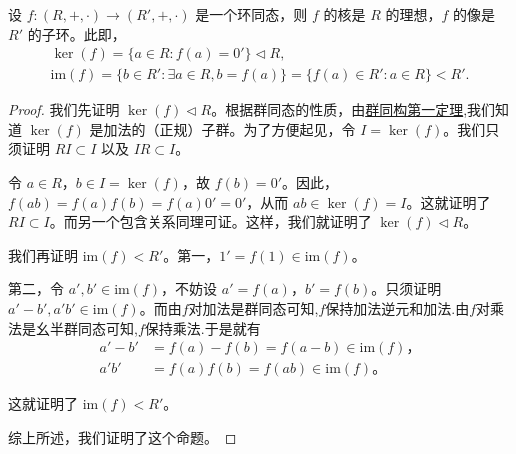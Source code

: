 \documentclass[../../main.tex]{subfiles}
\begin{document}
\begin{proposition}[环同态的核是理想并且像是子环]\label{proposition:环同态的核是理想并且像是子环}
设 $f : (R, +, \cdot) \to (R', +, \cdot)$ 是一个环同态，则 $f$ 的核是 $R$ 的理想，$f$ 的像是 $R'$ 的子环。此即，
\begin{gather*}
\ker(f) = \{a \in R : f(a) = 0'\} \lhd R,\\
\mathrm{im}(f) = \{b \in R' : \exists a \in R, b = f(a)\} = \{f(a) \in R' : a \in R\} < R'.
\end{gather*}
\end{proposition}
\begin{proof}
我们先证明 $\ker(f) \lhd R$。根据群同态的性质，由\hyperref[theorem:群同构第一定理]{群同构第一定理},我们知道 $\ker(f)$ 是加法的（正规）子群。为了方便起见，令 $I = \ker(f)$。我们只须证明 $RI \subset I$ 以及 $IR \subset I$。

令 $a \in R$，$b \in I = \ker(f)$，故 $f(b) = 0'$。因此，$f(ab) = f(a)f(b) = f(a)0' = 0'$，从而 $ab \in \ker(f) = I$。这就证明了 $RI \subset I$。而另一个包含关系同理可证。这样，我们就证明了 $\ker(f) \lhd R$。

我们再证明 $\mathrm{im}(f) < R'$。第一，$1' = f(1) \in \mathrm{im}(f)$。

第二，令 $a', b' \in \mathrm{im}(f)$，不妨设 $a' = f(a)$，$b' = f(b)$。只须证明 $a' - b', a'b' \in \mathrm{im}(f)$。而由$f$对加法是群同态可知,$f$保持加法逆元和加法.由$f$对乘法是幺半群同态可知,$f$保持乘法.于是就有
\begin{align*}
a' - b' &= f(a) - f(b) = f(a - b) \in \mathrm{im}(f) ，\\
a'b' &= f(a)f(b) = f(ab) \in \mathrm{im}(f)。
\end{align*}

这就证明了 $\mathrm{im}(f) < R'$。

综上所述，我们证明了这个命题。 
\end{proof}
\end{document}
